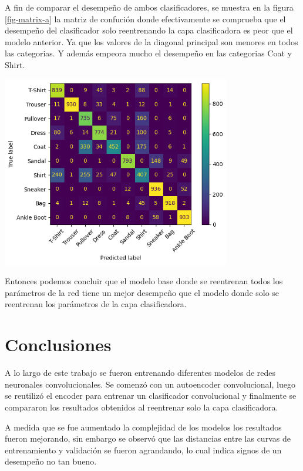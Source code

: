 \documentclass[aps,prl,reprint,groupedaddress]{revtex4-2}
\newenvironment{Figura}
  {\par\medskip\noindent\minipage{\linewidth}}
  {\endminipage\par\medskip}
\begin{document}
A fin de comparar el desempeño de ambos clasificadores, se muestra en la figura
\ref{fig-matrix-a} la matriz de confución donde efectivamente se comprueba que 
el desempeño del clasificador solo reentrenando la capa clasificadora es peor
que el modelo anterior. Ya que los valores de la diagonal principal son menores
en todos las categorias. Y además empeora mucho el desempeño en las categorias 
Coat y Shirt.
\begin{Figura}
  \centering
  \includegraphics[width=0.75\textwidth]{figs1/matrix_confucion_modelo_original_entrenando_solo_clasificadora.png}
  \label{fig-matrix-a}
\end{Figura}

Entonces podemos concluir que el modelo base donde se reentrenan todos los
parámetros de la red tiene un mejor desempeño que el modelo donde solo se
reentrenan los parámetros de la capa clasificadora.

\section{Conclusiones}

A lo largo de este trabajo se fueron entrenando diferentes modelos de redes
neuronales convolucionales. Se comenzó con un autoencoder convolucional,
luego se reutilizó el encoder para entrenar un clasificador convolucional y
finalmente se compararon los resultados obtenidos al reentrenar solo la capa
clasificadora.

A medida que se fue aumentado la complejidad de los modelos los resultados
fueron mejorando, sin embargo se observó que las distancias entre las curvas
de entrenamiento y validación se fueron agrandando, lo cual indica signos de 
un desempeño no tan bueno.
\end{document}
